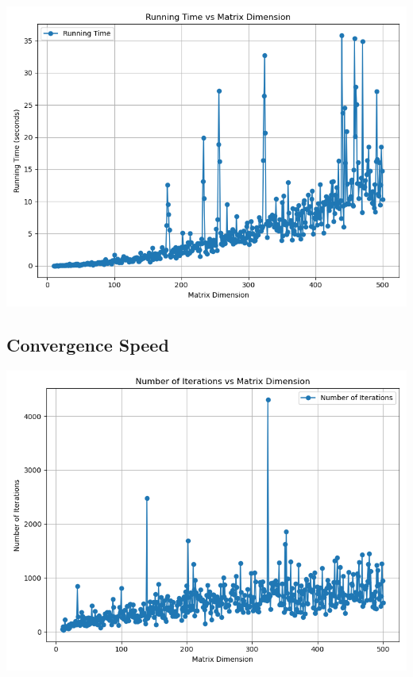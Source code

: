 \documentclass[12pt, a4paper]{ctexart}
\begin{document}
\begin{center}
    \includegraphics[scale=0.5]{running_time.png}
\end{center}

\subsection{Convergence Speed}

\begin{center}
    \includegraphics[scale=0.5]{iteration_time.png}
\end{center}
\end{document}
